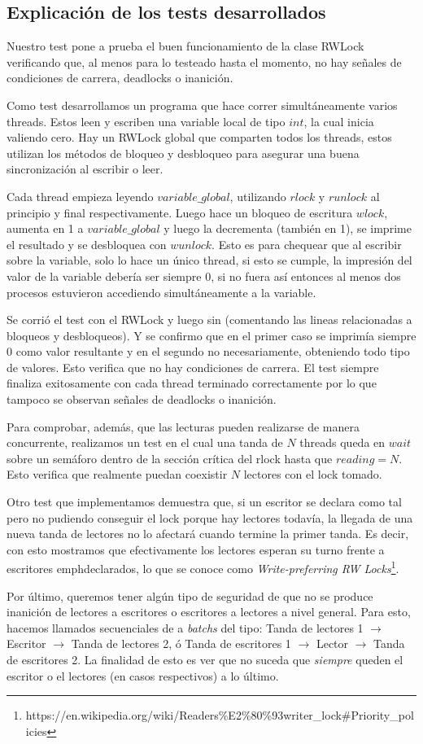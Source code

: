 \subsection{Explicación de los tests desarrollados}

Nuestro test pone a prueba el buen funcionamiento de la clase RWLock verificando que, al menos para lo testeado hasta el momento, no hay señales de condiciones de carrera, deadlocks o inanición. 

Como test desarrollamos un programa que hace correr simultáneamente varios threads. Estos leen y escriben una variable local de tipo $int$, la cual inicia valiendo cero. Hay un RWLock global que comparten todos los threads, estos utilizan los métodos de bloqueo y desbloqueo para asegurar una buena sincronización al escribir o leer.

Cada thread empieza leyendo $variable\_global$, utilizando $rlock$ y $runlock$ al principio y final respectivamente. Luego hace un bloqueo de escritura $wlock$, aumenta en 1 a $variable\_global$ y luego la decrementa (también en 1), se imprime el resultado y se desbloquea con $wunlock$. Esto es para chequear que al escribir sobre la variable, solo lo hace un único thread, si esto se cumple, la impresión del valor de la variable debería ser siempre $0$, si no fuera así entonces al menos dos procesos estuvieron accediendo simultáneamente a la variable.

Se corrió el test con el RWLock y luego sin (comentando las lineas relacionadas a bloqueos y desbloqueos). Y se confirmo que en el primer caso se imprimía siempre 0 como valor resultante y en el segundo no necesariamente, obteniendo todo tipo de valores. Esto verifica que no hay condiciones de carrera. El test siempre finaliza exitosamente con cada thread terminado correctamente por lo que tampoco se observan señales de deadlocks o inanición.

Para comprobar, además, que las lecturas pueden realizarse de manera concurrente, realizamos un test en el cual una tanda de $N$ threads queda en $wait$ sobre un semáforo dentro de la sección crítica del rlock hasta que $reading = N$. Esto verifica que realmente puedan coexistir $N$ lectores con el lock tomado.

Otro test que implementamos demuestra que, si un escritor se declara como tal pero no pudiendo conseguir el lock porque hay lectores todavía, la llegada de una nueva tanda de lectores no lo afectará cuando termine la primer tanda. Es decir, con esto mostramos que efectivamente los lectores esperan su turno frente a escritores emph{declarados}, lo que se conoce como \emph{Write-preferring RW Locks}\footnote{https://en.wikipedia.org/wiki/Readers\%E2\%80\%93writer\_lock\#Priority\_policies}.

Por último, queremos tener algún tipo de seguridad de que no se produce inanición de lectores a escritores o escritores a lectores a nivel general. Para esto, hacemos llamados secuenciales de a \emph{batchs} del tipo: Tanda de lectores 1 $\rightarrow$ Escritor $\rightarrow$ Tanda de lectores 2, ó Tanda de escritores 1 $\rightarrow$ Lector $\rightarrow$ Tanda de escritores 2. La finalidad de esto es ver que no suceda que \emph{siempre} queden el escritor o el lectores (en casos respectivos) a lo último.
